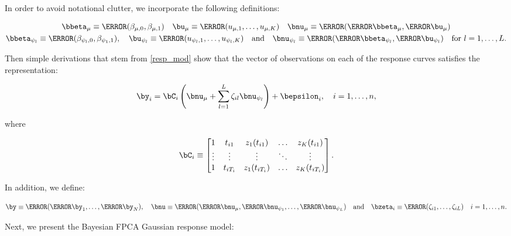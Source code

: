 \documentclass[12pt]{article}
\def\betamu{\bbeta_\mu}
\def\umu{\bu_\mu}
\def\numu{\bnu_\mu}
\newcommand\betapsi[1]{\bbeta_{\psi_{#1}}}
\newcommand\upsi[1]{\bu_{\psi_{#1}}}
\newcommand\nupsi[1]{\bnu_{\psi_{#1}}}
\theoremstyle{plain}
\theoremstyle{definition}
\theoremstyle{remark}
\begin{document}
In order to avoid notational clutter, we incorporate the following definitions:

\[
\begin{gathered}
	\betamu \equiv \T{(\beta_{\mu, 0}, \beta_{\mu, 1})} \quad
		\umu \equiv \T{(u_{\mu, 1}, \dots, u_{\mu, K})} \quad
		\numu \equiv \T{(\T{\betamu}, \T{\umu})} \\
	\betapsi{l} \equiv \T{(\beta_{\psi_l, 0}, \beta_{\psi_1, 1})}, \quad
		\upsi{l} \equiv \T{(u_{\psi_l, 1}, \dots, u_{\psi_l, K})} \quad
		\text{and} \quad
		\nupsi{l} \equiv \T{(\T{\betapsi{l}}, \T{\upsi{l}})} \quad
		\text{for $l = 1, \dots, L$}.
\end{gathered}
\]

\noindent Then simple derivations that stem from \eqref{resp_mod} show that the vector of observations on
each of the response curves satisfies the representation:

\[
	\by_i = \bC_i \left(
		\numu + \sum_{l=1}^L \zeta_{il} \nupsi{l}
	\right) + \bepsilon_{i}, \quad i = 1, \dots, n,
\]

\noindent where

\begin{equation}
	\bC_i \equiv \begin{bmatrix}
		1 & t_{i1} & z_1 (t_{i1}) & \dots & z_K (t_{i1}) \\
		\vdots & \vdots & \vdots & \ddots & \vdots \\
		1 & t_{iT_i} & z_1 (t_{iT_i}) & \dots & z_K (t_{iT_i})
	\end{bmatrix}.
\label{C_mat}
\end{equation}

\noindent In addition, we define:

\begin{equation}
	\by \equiv \T{(\T{\by_1}, \dots, \T{\by_N})}, \quad
	\bnu \equiv \T{(\T{\numu}, \T{\nupsi{1}}, \dots, \T{\nupsi{L}})} \quad
	\text{and} \quad
	\bzeta_i \equiv \T{(\zeta_{i1}, \dots, \zeta_{iL})} \quad i = 1, \dots, n.
\label{partitioned_vectors}
\end{equation}

Next, we present the Bayesian FPCA Gaussian response model:
\end{document}
